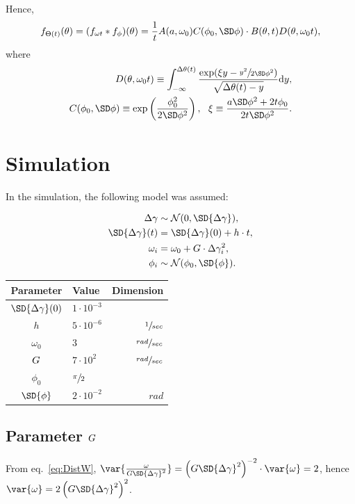 \documentclass{article}
\newcommand{\Norm}{\mathcal{N}}
\begin{document}
Hence, 
\begin{align*}
	\ftht(\theta) = (\fwt*\fp)(\theta) = \frac1t\A\C\cdot\B\CDF,
\end{align*}
where 
\begin{align}
		\CDF \equiv \CDF*, \\ \C \equiv \C*, ~~ \X \equiv \X*.
\end{align}

\section{Simulation}
\newcommand{\ytcoef}{h}
\newcommand{\dwcoef}{g}
\newcommand{\vp}[2]{{#1}\cdot 10^{#2} }

In the simulation, the following model was assumed:\\
\begin{minipage}{.5\textwidth}
	\begin{align*}
		\dy &\sim \Norm(0, \SD{\dy}), \\
		\SD{\dy}(t) &= \SD{\dy}(0) + \ytcoef\cdot t, \\
		\omega_i &= \omega_0 + \wycoef\cdot \dy_i^2, \\
		\phi_i &\sim \Norm(\phi_0, \SD{\phi}).
	\end{align*}
\end{minipage}
\begin{minipage}{.5\textwidth}
	\begin{tabular}{clr}
		Parameter   & Value            &          Dimension \\ \hline
		$\SD{\dy}(0)$ & $\vp{1}{-3}$     &  \\
		$\ytcoef$    & $\vp{5}{-6}$     &   $\sfrac{1}{sec}$ \\
		$\omega_0$   & $3$              & $\sfrac{rad}{sec}$ \\
		$G$    & $\vp{7}{2}$      & $\sfrac{rad}{sec}$ \\
		$\phi_0$    & $\sfrac{\pi}{2}$ &  \\
		$\SD{\phi}$  & $\vp{2}{-2}$     &              $rad$ \\ \hline
	\end{tabular}
\end{minipage}

\subsection{Parameter $G$}
From eq.~\eqref{eq:DistW}, $\var{\frac{\omega}{\wycoef\SD{\dy}^2}} = \bkt{\wycoef\SD{\dy}^2}^{-2}\cdot\var{\omega}  = 2$, hence $\var{\omega} = 2\bkt{\wycoef\SD{\dy}^2}^2$.
\end{document}
